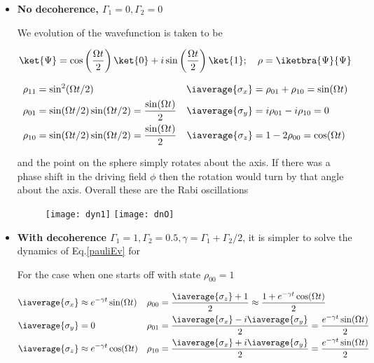 \begin{itemize}
  \newpage
\item          \textbf{           No          decoherence,
    $ \Gamma_1 = 0, \Gamma_2 = 0 $}

  We evolution  of the wavefunction is  taken to be 

  \begin{equation}\label{dunamicState}
    \ket{\Psi} = \cos\left(\frac{\Omega t}{2}\right)\ket{0} + i\sin\left(\frac{\Omega t}{2}\right)\ket{1}; \quad \rho = \iketbra{\Psi}{\Psi}
  \end{equation}


  \begin{equation}\label{dyn1}
    \begin{aligned}
      \rho_{11} & = \sin^2(\Omega t/2) & \iaverage{\sigma_x} & = \rho_{01}+\rho_{10} = \sin(\Omega t)\\
      \rho_{01} & = \sin(\Omega t/2)\sin(\Omega t/2) = \frac{\sin(\Omega t)}{2} & \iaverage{\sigma_y} & = i\rho_{01}-i\rho_{10} = 0\\
      \rho_{10} & = \sin(\Omega t/2)\sin(\Omega t/2) = \frac{\sin(\Omega t)}{2} & \iaverage{\sigma_z} & = 1- 2\rho_{00} = \cos(\Omega t)\\
    \end{aligned}
  \end{equation}

  \noindent  and the  point  on  the sphere  simply  rotates about  the
   axis.  If there was  a phase shift in the driving
  field $  \phi $  then the rotation  would turn by  that angle  about the
   axis. Overall these are the Rabi oscillations

  \begin{figure}[h]
    \texttt{[image: dyn1]}
    \texttt{[image: dnO]}
  \end{figure}

  \newpage
\item       \textbf{\textbf{        With       decoherence
      $ \Gamma_1 =  1, \Gamma_2 = 0.5, \gamma =  \Gamma_1+\Gamma_2/2 $}}, it
  is  simpler   to  solve   the  dynamics  of   Eq.\eqref{pauliEv}  for
  \iaverage{\vec{\sigma}}

  For the case when one starts off with state $ \rho_{00} = 1 $

  \begin{equation}\label{dyn2}
    \begin{aligned}
      \iaverage{\sigma_x} & \approx e^{-\gamma t} \sin(\Omega t) & \rho_{00} & = \frac{\iaverage{\sigma_z}+1}{2} \approx\frac{1+e^{-\gamma t} \cos(\Omega t)}{2}\\
      \iaverage{\sigma_y} & = 0 & \rho_{01} & = \frac{\iaverage{\sigma_x}-i\iaverage{\sigma_y}}{2} = \frac{e^{-\gamma t} \sin(\Omega t)}{2}\\
      \iaverage{\sigma_z} & \approx e^{-\gamma t} \cos(\Omega t) & \rho_{10} & = \frac{\iaverage{\sigma_x}+i\iaverage{\sigma_y}}{2} = \frac{e^{-\gamma t} \sin(\Omega t)}{2}\\
    \end{aligned}
  \end{equation}


\end{itemize}
